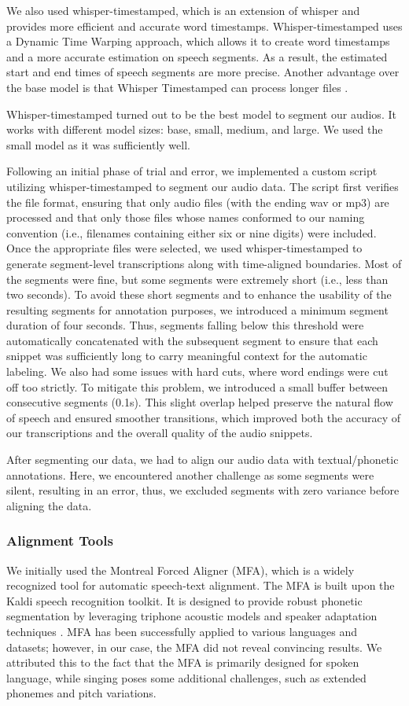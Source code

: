 \documentclass[a4paper]{article}
\begin{document}
We also used whisper-timestamped, which is an extension of whisper and provides more efficient and accurate word timestamps. Whisper-timestamped uses a Dynamic Time Warping approach, which allows it to create word timestamps and a more accurate estimation on speech segments. As a result, the estimated start and end times of speech segments are more precise. Another advantage over the base model is that Whisper Timestamped can process longer files \cite{Andreyev2025}.

Whisper-timestamped turned out to be the best model to segment our audios. It works with different model sizes: base, small, medium, and large. We used the small model as it was sufficiently well.

Following an initial phase of trial and error, we implemented a custom script utilizing whisper-timestamped to segment our audio data. The script first verifies the file format, ensuring that only audio files (with the ending wav or mp3) are processed and that only those files whose names conformed to our naming convention (i.e., filenames containing either six or nine digits) were included. Once the appropriate files were selected, we used whisper-timestamped to generate segment-level transcriptions along with time-aligned boundaries. Most of the segments were fine, but some segments were extremely short (i.e., less than two seconds). To avoid these short segments and to enhance the usability of the resulting segments for annotation purposes, we introduced a minimum segment duration of four seconds. Thus, segments falling below this threshold were automatically concatenated with the subsequent segment to ensure that each snippet was sufficiently long to carry meaningful context for the automatic labeling. We also had some issues with hard cuts, where word endings were cut off too strictly. To mitigate this problem, we introduced a small buffer between consecutive segments (0.1s). This slight overlap helped preserve the natural flow of speech and ensured smoother transitions, which improved both the accuracy of our transcriptions and the overall quality of the audio snippets.

After segmenting our data, we had to align our audio data with textual/phonetic annotations. Here, we encountered another challenge as some segments were silent, resulting in an error, thus, we excluded segments with zero variance before aligning the data.

\subsubsection*{Alignment Tools}
We initially used the Montreal Forced Aligner (MFA), which is a widely recognized tool for automatic speech-text alignment. The MFA is built upon the Kaldi speech recognition toolkit. It is designed to provide robust phonetic segmentation by leveraging triphone acoustic models and speaker adaptation techniques \cite{McAuliffe2017}. MFA has been successfully applied to various languages and datasets; however, in our case, the MFA did not reveal convincing results. We attributed this to the fact that the MFA is primarily designed for spoken language, while singing poses some additional challenges, such as extended phonemes and pitch variations.
\end{document}
